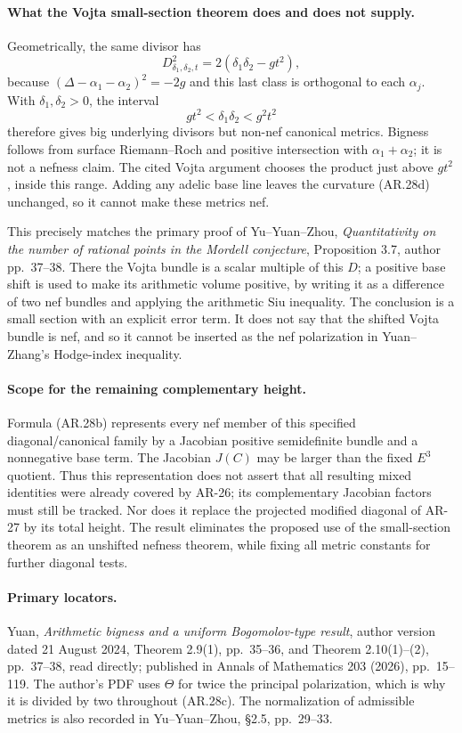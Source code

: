 \paragraph{What the Vojta small-section theorem does and does not supply.}
Geometrically, the same divisor has
\[
 D_{\delta_1,\delta_2,t}^{2}
       =2(\delta_1\delta_2-gt^2),                       \tag{AR.28e}
\]
because $(\Delta-\alpha_1-\alpha_2)^2=-2g$ and this last
class is orthogonal to each $\alpha_j$.  With
$\delta_1,\delta_2>0$, the interval
\[
 gt^2<\delta_1\delta_2<g^2t^2
\]
therefore gives big underlying divisors but non-nef canonical
metrics.  Bigness follows from surface Riemann--Roch and positive
intersection with $\alpha_1+\alpha_2$; it is not a nefness claim.
The cited Vojta argument chooses the product just above $gt^2$,
inside this range.
Adding any adelic base line leaves the curvature (AR.28d)
unchanged, so it cannot make these metrics nef.

This precisely matches the primary proof of Yu--Yuan--Zhou,
\emph{Quantitativity on the number of rational points in the
Mordell conjecture}, Proposition 3.7, author pp.~37--38.  There
the Vojta bundle is a scalar multiple of this $D$; a positive
base shift is used to make its arithmetic volume positive, by
writing it as a difference of two nef bundles and applying the
arithmetic Siu inequality.  The conclusion is a small section
with an explicit error term.  It does not say that the shifted
Vojta bundle is nef, and so it cannot be inserted as the nef
polarization in Yuan--Zhang's Hodge-index inequality.

\paragraph{Scope for the remaining complementary height.}
Formula (AR.28b) represents every nef member of this specified
diagonal/canonical family by a Jacobian positive semidefinite
bundle and a nonnegative base term.  The Jacobian $J(C)$ may be
larger than the fixed $E^3$ quotient.  Thus this representation
does not assert that all resulting mixed identities were already
covered by AR-26; its complementary Jacobian factors must still
be tracked.  Nor does it replace the projected modified diagonal
of AR-27 by its total height.  The result eliminates the proposed
use of the small-section theorem as an unshifted nefness theorem,
while fixing all metric constants for further diagonal tests.

\paragraph{Primary locators.}
Yuan, \emph{Arithmetic bigness and a uniform Bogomolov-type
result}, author version dated 21 August 2024,
Theorem 2.9(1), pp.~35--36, and Theorem 2.10(1)--(2),
pp.~37--38, read directly; published in Annals of Mathematics
203 (2026), pp.~15--119.  The author's PDF uses $\Theta$ for
twice the principal polarization, which is why it is divided
by two throughout (AR.28c).  The normalization of admissible
metrics is also recorded in Yu--Yuan--Zhou, \S2.5, pp.~29--33.
